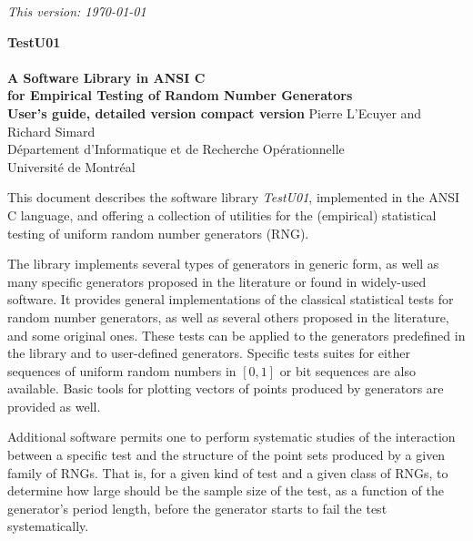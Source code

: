 \begin {titlepage}

\null 
\begin {flushright} \it This version: \today \end {flushright}

\vfill
\begin{center}
 {\Large\bf TestU01} \\ \ \\
 {\large\bf A Software Library in ANSI C \\[6pt]
    for Empirical Testing of Random Number Generators}\\
\vfill
{\bf   User's guide, 
 \ifdetailed  detailed version \else compact version \fi }
\vfill
 Pierre L'Ecuyer and Richard Simard \\[10pt]
D\'epartement d'Informatique et de Recherche Op\'erationnelle \\
Universit\'e de Montr\'eal \\
\end{center}
\vfill

This document describes the software library {\em TestU01}, 
implemented in the ANSI C language,
and offering a collection of utilities for the (empirical)
statistical testing of uniform random number generators (RNG).

The library implements several types of generators in
generic form, as well as many specific generators proposed in
the literature or found in widely-used software.
It provides general implementations of the classical statistical tests
for random number generators, as well as several others proposed in the
literature, and some original ones.
These tests can be applied to the generators predefined in the library
and to user-defined generators.
Specific tests suites for either sequences of uniform random numbers
in $[0,1]$ or bit sequences are also available.
Basic tools for plotting vectors of points produced by generators
are provided as well.

Additional software permits one to perform
systematic studies of the interaction between a specific test
and the structure of the point sets produced by a given family of RNGs.
That is, for a given kind of test and a given class of RNGs, 
to determine how large should be the sample size of the test,
as a function of the generator's period length, 
before the generator starts to fail the test systematically.

\vfill
\end{titlepage}

